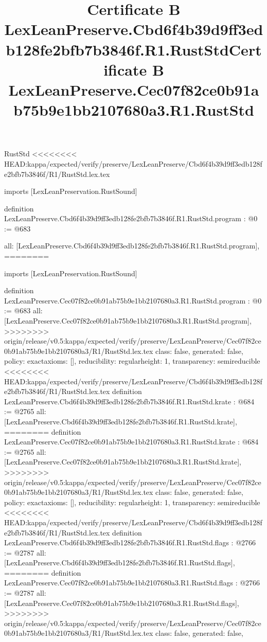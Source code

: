 \begin{lexlean}{RustStd}
<<<<<<<< HEAD:kappa/expected/verify/preserve/LexLeanPreserve/Cbd6f4b39d9ff3edb128fe2bfb7b3846f/R1/RustStd.lex.tex
\title{Certificate B LexLeanPreserve.Cbd6f4b39d9ff3edb128fe2bfb7b3846f.R1.RustStd}
\begin{coremodule}
imports [LexLeanPreservation.RustSound]

definition LexLeanPreserve.Cbd6f4b39d9ff3edb128fe2bfb7b3846f.R1.RustStd.program : @0 := @683 {
  all: [LexLeanPreserve.Cbd6f4b39d9ff3edb128fe2bfb7b3846f.R1.RustStd.program],
========
\title{Certificate B LexLeanPreserve.Cec07f82ce0b91ab75b9e1bb2107680a3.R1.RustStd}
\begin{coremodule}
imports [LexLeanPreservation.RustSound]

definition LexLeanPreserve.Cec07f82ce0b91ab75b9e1bb2107680a3.R1.RustStd.program : @0 := @683 {
  all: [LexLeanPreserve.Cec07f82ce0b91ab75b9e1bb2107680a3.R1.RustStd.program],
>>>>>>>> origin/release/v0.5:kappa/expected/verify/preserve/LexLeanPreserve/Cec07f82ce0b91ab75b9e1bb2107680a3/R1/RustStd.lex.tex
  class: false,
  generated: false,
  policy: exact{axioms: []},
  reducibility: regular{height: 1},
  transparency: semireducible
}
<<<<<<<< HEAD:kappa/expected/verify/preserve/LexLeanPreserve/Cbd6f4b39d9ff3edb128fe2bfb7b3846f/R1/RustStd.lex.tex
definition LexLeanPreserve.Cbd6f4b39d9ff3edb128fe2bfb7b3846f.R1.RustStd.krate : @684 := @2765 {
  all: [LexLeanPreserve.Cbd6f4b39d9ff3edb128fe2bfb7b3846f.R1.RustStd.krate],
========
definition LexLeanPreserve.Cec07f82ce0b91ab75b9e1bb2107680a3.R1.RustStd.krate : @684 := @2765 {
  all: [LexLeanPreserve.Cec07f82ce0b91ab75b9e1bb2107680a3.R1.RustStd.krate],
>>>>>>>> origin/release/v0.5:kappa/expected/verify/preserve/LexLeanPreserve/Cec07f82ce0b91ab75b9e1bb2107680a3/R1/RustStd.lex.tex
  class: false,
  generated: false,
  policy: exact{axioms: []},
  reducibility: regular{height: 1},
  transparency: semireducible
}
<<<<<<<< HEAD:kappa/expected/verify/preserve/LexLeanPreserve/Cbd6f4b39d9ff3edb128fe2bfb7b3846f/R1/RustStd.lex.tex
definition LexLeanPreserve.Cbd6f4b39d9ff3edb128fe2bfb7b3846f.R1.RustStd.flags : @2766 := @2787 {
  all: [LexLeanPreserve.Cbd6f4b39d9ff3edb128fe2bfb7b3846f.R1.RustStd.flags],
========
definition LexLeanPreserve.Cec07f82ce0b91ab75b9e1bb2107680a3.R1.RustStd.flags : @2766 := @2787 {
  all: [LexLeanPreserve.Cec07f82ce0b91ab75b9e1bb2107680a3.R1.RustStd.flags],
>>>>>>>> origin/release/v0.5:kappa/expected/verify/preserve/LexLeanPreserve/Cec07f82ce0b91ab75b9e1bb2107680a3/R1/RustStd.lex.tex
  class: false,
  generated: false,
}}}
\end{coremodule}}
\end{coremodule}
\end{lexlean}
